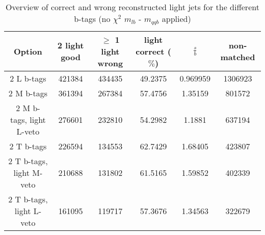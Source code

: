 \begin{table}[!h] 
 \begin{tabular}{c|c|c|c|c|c} 
  \textbf{Option} & 2 light good  & $\geq$ 1 light wrong & light correct ($\%$) & $\frac{s}{b}$ & non-matched \\ \hline 
  2 L b-tags              & 421384 & 434435 & 49.2375 & 0.969959 & 1306923\\ 
  2 M b-tags              & 361394 & 267384 & 57.4756 & 1.35159 & 801572\\ 
  2 M b-tags, light L-veto & 276601 & 232810 & 54.2982 & 1.1881 & 637194\\ 
  2 T b-tags              & 226594 & 134553 & 62.7429 & 1.68405 & 423807\\ 
  2 T b-tags, light M-veto & 210688 & 131802 & 61.5165 & 1.59852 & 402339\\ 
  2 T b-tags, light L-veto & 161095 & 119717 & 57.3676 & 1.34563 & 322679\\ 
 \end{tabular} 
 \caption{Overview of correct and wrong reconstructed light jets for the different b-tags (no $\chi^{2}$ $m_{lb}$ - $m_{qqb}$ applied)}
\end{table} 
 
